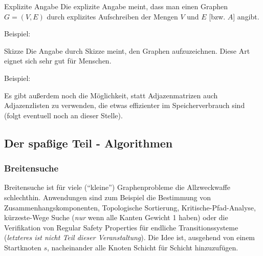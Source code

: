 \documentclass{panikzettel}
\begin{document}
\begin{halfboxl}
	\vspace{-\baselineskip}		
	\begin{defi}{Explizite Angabe}
		Die explizite Angabe meint, dass man einen Graphen $G= (V,E)$ durch explizites Aufschreiben der Mengen $V$ und $E$ [bzw. $A$] angibt.
		
		Beispiel: 
	\end{defi}
	
\end{halfboxl}%
\begin{halfboxr}
	\vspace{-\baselineskip}	
	\begin{defi}{Skizze}
		Die Angabe durch Skizze meint, den Graphen aufzuzeichnen. Diese Art eignet sich sehr gut für Menschen.
		
		Beispiel: 
	\end{defi}
	
\end{halfboxr}

Es gibt außerdem noch die Möglichkeit, statt Adjazenmatrizen auch Adjazenzlisten zu verwenden, die etwas effizienter im Speicherverbrauch sind (folgt eventuell noch an dieser Stelle).

\subsection{Der spaßige Teil - Algorithmen}

\subsubsection{Breitensuche}

Breitensuche ist für viele (``kleine'') Graphenprobleme die Allzweckwaffe schlechthin. Anwendungen sind zum Beispiel die Bestimmung von Zusammenhangskomponenten, Topologische Sortierung, Kritische-Pfad-Analyse, kürzeste-Wege Suche (\emph{nur} wenn alle Kanten Gewicht 1 haben) oder die Verifikation von Regular Safety Properties für endliche Transitionssysteme (\textit{letzteres ist nicht Teil dieser Veranstaltung}). Die Idee ist, ausgehend von einem Startknoten $s$, nacheinander alle Knoten Schicht für Schicht hinzuzufügen.
\end{document}
